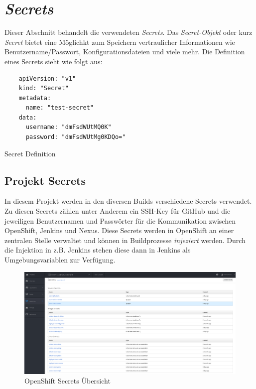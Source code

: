 \section{\emph{Secrets}}
\label{sec:buildserver-secrets}
Dieser Abschnitt behandelt die verwendeten \emph{Secrets}. Das \emph{Secret-Objekt} oder kurz \emph{Secret} bietet eine Möglichkt zum Speichern vertraulicher Informationen wie Benutzername/Passwort, Konfigurationsdateien und viele mehr. Die Definition eines Secrets sieht wie folgt aus:

\begin{listing}[H]
	\centering
	\begin{verbatim}
	apiVersion: "v1"
	kind: "Secret"
	metadata:
	  name: "test-secret"
	data: 
	  username: "dmFsdWUtMQ0K"
	  password: "dmFsdWUtMg0KDQo="
	\end{verbatim}
	\caption{Secret Definition}
\end{listing}

\subsection{Projekt Secrets}

In diesem Projekt werden in den diversen Builds verschiedene Secrets verwendet. Zu diesen Secrets zählen unter Anderem ein SSH-Key für GitHub und die jeweiligen Benutzernamen und Passwörter für die Kommunikation zwischen OpenShift, Jenkins und Nexus. Diese Secrets werden in OpenShift an einer zentralen Stelle verwaltet und können in Buildprozesse \emph{injeziert} werden. Durch die Injektion in z.B. Jenkins stehen diese dann in Jenkins als Umgebungsvariablen zur Verfügung.

\begin{figure}[H]
	\centering
	\includegraphics[scale=0.3]{image/openshift-secrets.png}
	\caption{OpenShift Secrets Übersicht}
	\label{fig:architecture}
\end{figure}